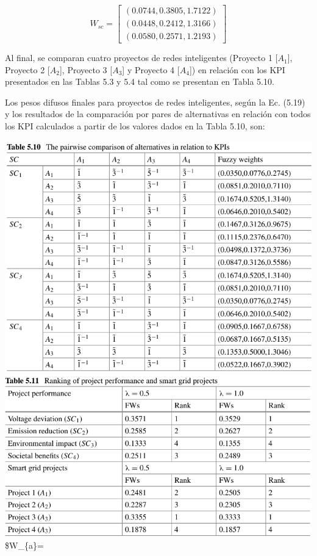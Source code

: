 \documentclass[
]{article}
\begin{document}
\[W_{sc}=\begin{bmatrix}(0.0744, 0.3805, 1.7122)\\ (0.0448, 0.2412, 1.3166)\\ (0.0580, 0.2571, 1.2193)\end{bmatrix} \]

Al final, se comparan cuatro proyectos de redes inteligentes (Proyecto 1
{[}\(A_1\){]}, Proyecto 2 {[}\(A_2\){]}, Proyecto 3 {[}\(A_3\){]} y
Proyecto 4 {[}\(A_4\){]}) en relación con los KPI presentados en las
Tablas 5.3 y 5.4 tal como se presentan en Tabla 5.10.

Los pesos difusos finales para proyectos de redes inteligentes, según la
Ec. (5.19) y los resultados de la comparación por pares de alternativas
en relación con todos los KPI calculados a partir de los valores dados
en la Tabla 5.10, son:

\includegraphics{fotos/tabla5.10.png}
\includegraphics{fotos/tabla5.11.png} \$W\_\{a\}=
\end{document}
